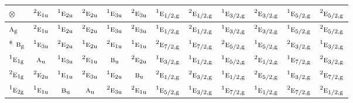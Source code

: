 \documentclass[10pt,a4paper]{article}
\numberwithin{equation}{section}
\newcommand{\irr}[1]{\text{\normalfont\scshape #1}}
\newcommand{\conjpair}[1]{{}^{#1}}
\newcommand{\ptag}[1]{\mathrm{#1}}
\newcommand{\irrprod}{\otimes}
\begin{document}
{\small\setlength{\tabcolsep}{3pt}\begin{longtable}{@{}lccccccccccc@{}}\toprule
$\irrprod$ & $\conjpair{2}\irr{e}_{1\ptag{u}}$ & $\conjpair{1}\irr{e}_{2\ptag{u}}$ & $\conjpair{2}\irr{e}_{2\ptag{u}}$ & $\conjpair{1}\irr{e}_{3\ptag{u}}$ & $\conjpair{2}\irr{e}_{3\ptag{u}}$ & $\conjpair{1}\irr{e}_{1/2,\ptag{g}}$ & $\conjpair{2}\irr{e}_{1/2,\ptag{g}}$ & $\conjpair{1}\irr{e}_{3/2,\ptag{g}}$ & $\conjpair{2}\irr{e}_{3/2,\ptag{g}}$ & $\conjpair{1}\irr{e}_{5/2,\ptag{g}}$ & $\conjpair{2}\irr{e}_{5/2,\ptag{g}}$\\\midrule\endhead
\bottomrule\endfoot\endlastfoot
$\irr{a}_{\ptag{g}}$ & $\conjpair{2}\irr{e}_{1\ptag{u}}$ & $\conjpair{1}\irr{e}_{2\ptag{u}}$ & $\conjpair{2}\irr{e}_{2\ptag{u}}$ & $\conjpair{1}\irr{e}_{3\ptag{u}}$ & $\conjpair{2}\irr{e}_{3\ptag{u}}$ & $\conjpair{1}\irr{e}_{1/2,\ptag{g}}$ & $\conjpair{2}\irr{e}_{1/2,\ptag{g}}$ & $\conjpair{1}\irr{e}_{3/2,\ptag{g}}$ & $\conjpair{2}\irr{e}_{3/2,\ptag{g}}$ & $\conjpair{1}\irr{e}_{5/2,\ptag{g}}$ & $\conjpair{2}\irr{e}_{5/2,\ptag{g}}$\\*
$\irr{b}_{\ptag{g}}$ & $\conjpair{1}\irr{e}_{3\ptag{u}}$ & $\conjpair{2}\irr{e}_{2\ptag{u}}$ & $\conjpair{1}\irr{e}_{2\ptag{u}}$ & $\conjpair{2}\irr{e}_{1\ptag{u}}$ & $\conjpair{1}\irr{e}_{1\ptag{u}}$ & $\conjpair{2}\irr{e}_{7/2,\ptag{g}}$ & $\conjpair{1}\irr{e}_{7/2,\ptag{g}}$ & $\conjpair{2}\irr{e}_{5/2,\ptag{g}}$ & $\conjpair{1}\irr{e}_{5/2,\ptag{g}}$ & $\conjpair{2}\irr{e}_{3/2,\ptag{g}}$ & $\conjpair{1}\irr{e}_{3/2,\ptag{g}}$\\
$\conjpair{1}\irr{e}_{1\ptag{g}}$ & $\irr{a}_{\ptag{u}}$ & $\conjpair{1}\irr{e}_{3\ptag{u}}$ & $\conjpair{2}\irr{e}_{1\ptag{u}}$ & $\irr{b}_{\ptag{u}}$ & $\conjpair{2}\irr{e}_{2\ptag{u}}$ & $\conjpair{1}\irr{e}_{3/2,\ptag{g}}$ & $\conjpair{1}\irr{e}_{1/2,\ptag{g}}$ & $\conjpair{1}\irr{e}_{5/2,\ptag{g}}$ & $\conjpair{2}\irr{e}_{1/2,\ptag{g}}$ & $\conjpair{1}\irr{e}_{7/2,\ptag{g}}$ & $\conjpair{2}\irr{e}_{3/2,\ptag{g}}$\\
$\conjpair{2}\irr{e}_{1\ptag{g}}$ & $\conjpair{2}\irr{e}_{2\ptag{u}}$ & $\conjpair{1}\irr{e}_{1\ptag{u}}$ & $\conjpair{2}\irr{e}_{3\ptag{u}}$ & $\conjpair{1}\irr{e}_{2\ptag{u}}$ & $\irr{b}_{\ptag{u}}$ & $\conjpair{2}\irr{e}_{1/2,\ptag{g}}$ & $\conjpair{2}\irr{e}_{3/2,\ptag{g}}$ & $\conjpair{1}\irr{e}_{1/2,\ptag{g}}$ & $\conjpair{2}\irr{e}_{5/2,\ptag{g}}$ & $\conjpair{1}\irr{e}_{3/2,\ptag{g}}$ & $\conjpair{2}\irr{e}_{7/2,\ptag{g}}$\\
$\conjpair{1}\irr{e}_{2\ptag{g}}$ & $\conjpair{1}\irr{e}_{1\ptag{u}}$ & $\irr{b}_{\ptag{u}}$ & $\irr{a}_{\ptag{u}}$ & $\conjpair{2}\irr{e}_{3\ptag{u}}$ & $\conjpair{2}\irr{e}_{1\ptag{u}}$ & $\conjpair{1}\irr{e}_{5/2,\ptag{g}}$ & $\conjpair{1}\irr{e}_{3/2,\ptag{g}}$ & $\conjpair{1}\irr{e}_{7/2,\ptag{g}}$ & $\conjpair{1}\irr{e}_{1/2,\ptag{g}}$ & $\conjpair{2}\irr{e}_{7/2,\ptag{g}}$ & $\conjpair{2}\irr{e}_{1/2,\ptag{g}}$\\

\end{longtable}}
\end{document}
